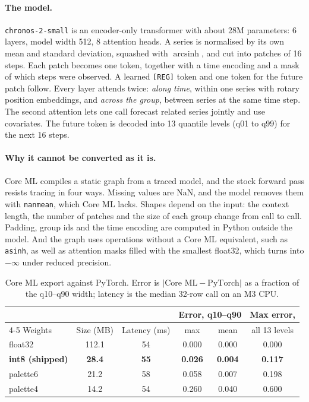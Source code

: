 \documentclass[11pt,a4paper]{article}
\begin{document}
\paragraph{The model.} \texttt{chronos-2-small} is an encoder-only transformer with about 28M parameters: 6 layers, model width 512, 8 attention heads. A series is normalised by its own mean and standard deviation, squashed with $\operatorname{arcsinh}$, and cut into patches of 16 steps. Each patch becomes one token, together with a time encoding and a mask of which steps were observed. A learned \texttt{[REG]} token and one token for the future patch follow. Every layer attends twice: \emph{along time}, within one series with rotary position embeddings, and \emph{across the group}, between series at the same time step. The second attention lets one call forecast related series jointly and use covariates. The future token is decoded into 13 quantile levels (q01 to q99) for the next 16 steps.

\paragraph{Why it cannot be converted as it is.} Core ML compiles a static graph from a traced model, and the stock forward pass resists tracing in four ways. Missing values are NaN, and the model removes them with \texttt{nanmean}, which Core ML lacks. Shapes depend on the input: the context length, the number of patches and the size of each group change from call to call. Padding, group ids and the time encoding are computed in Python outside the model. And the graph uses operations without a Core ML equivalent, such as \texttt{asinh}, as well as attention masks filled with the smallest float32, which turns into $-\infty$ under reduced precision.

\begin{table}[t]
  \centering\small
  \caption{Core ML export against PyTorch. Error is $|\text{Core ML}-\text{PyTorch}|$ as a fraction of the q10--q90 width; latency is the median 32-row call on an M3 CPU.}
  \label{tab:parity}
  \begin{tabular}{lccccc}
    \toprule
    & & & \multicolumn{2}{c}{Error, q10--q90} & Max error, \\
    \cmidrule(lr){4-5}
    Weights & Size (MB) & Latency (ms) & max & mean & all 13 levels \\
    \midrule
    float32 & 112.1 & 54 & 0.000 & 0.000 & 0.000 \\
    \textbf{int8 (shipped)} & \textbf{28.4} & \textbf{55} & \textbf{0.026} & \textbf{0.004} & \textbf{0.117} \\
    palette6 & 21.2 & 58 & 0.058 & 0.007 & 0.198 \\
    palette4 & 14.2 & 54 & 0.260 & 0.040 & 0.600 \\
    \bottomrule
  \end{tabular}
\end{table}
\end{document}
